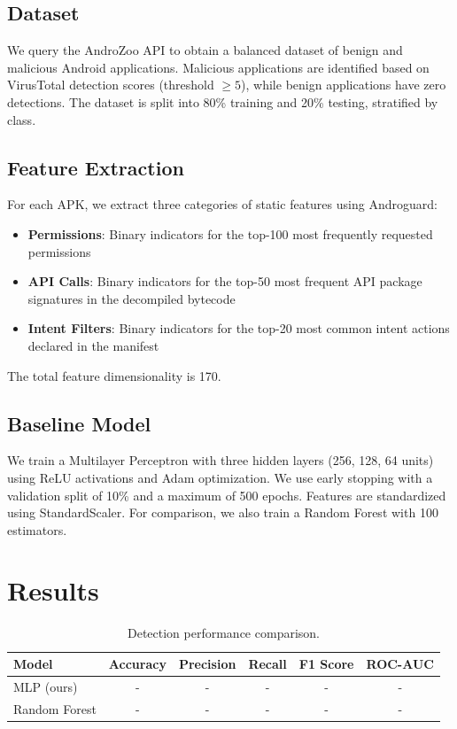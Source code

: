 \documentclass{article}
\begin{document}
\subsection{Dataset}
We query the AndroZoo API to obtain a balanced dataset of benign and malicious Android applications. Malicious applications are identified based on VirusTotal detection scores (threshold $\geq 5$), while benign applications have zero detections. The dataset is split into 80\% training and 20\% testing, stratified by class.

\subsection{Feature Extraction}
For each APK, we extract three categories of static features using Androguard:
\begin{itemize}
    \item \textbf{Permissions}: Binary indicators for the top-100 most frequently requested permissions
    \item \textbf{API Calls}: Binary indicators for the top-50 most frequent API package signatures in the decompiled bytecode
    \item \textbf{Intent Filters}: Binary indicators for the top-20 most common intent actions declared in the manifest
\end{itemize}
The total feature dimensionality is 170.

\subsection{Baseline Model}
We train a Multilayer Perceptron with three hidden layers (256, 128, 64 units) using ReLU activations and Adam optimization. We use early stopping with a validation split of 10\% and a maximum of 500 epochs. Features are standardized using StandardScaler. For comparison, we also train a Random Forest with 100 estimators.

\section{Results}
\label{sec:results}

\begin{table}[h]
\centering
\caption{Detection performance comparison.}
\label{tab:results}
\begin{tabular}{lccccc}
\toprule
Model & Accuracy & Precision & Recall & F1 Score & ROC-AUC \\
\midrule
MLP (ours) & - & - & - & - & - \\
Random Forest & - & - & - & - & - \\
\bottomrule
\end{tabular}
\end{table}
\end{document}
